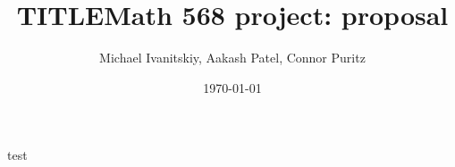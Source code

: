 \documentclass{article}
\title{TITLE}
\author{Michael Ivanitskiy, Aakash Patel, Connor Puritz}
\date{\today}
\title{Math 568 project: proposal}
\begin{document}
\maketitle\noindent

test \cite{luo2014dynamic}

{}

\end{document}
